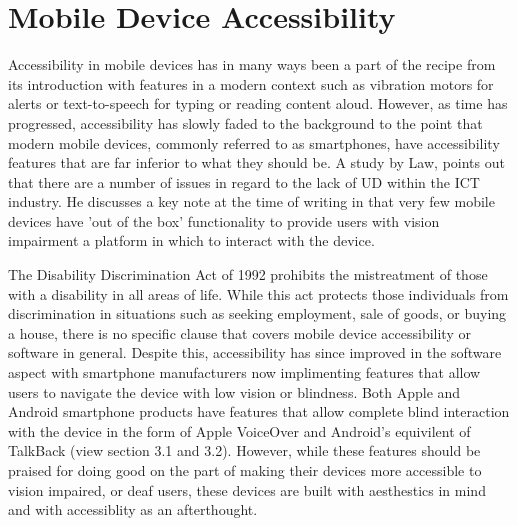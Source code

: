 
\section{Mobile Device Accessibility}
Accessibility in mobile devices has in many ways been a part of the recipe from its introduction with features in a modern context such as vibration motors for alerts or text-to-speech for typing or reading content aloud.
However, as time has progressed, accessibility has slowly faded to the background to the point that modern mobile devices, commonly referred to as smartphones, have accessibility features that are far inferior to what they should be. %
A study by Law\cite{cellphone}, points out that there are a number of issues in regard to the lack of UD within the ICT industry. %
He discusses a key note at the time of writing in that very few mobile devices have 'out of the box' functionality to provide users with vision impairment a platform in which to interact with the device. %

The Disability Discrimination Act of 1992\cite{dda1992} prohibits the mistreatment of those with a disability in all areas of life.
While this act protects those individuals from discrimination in situations such as seeking employment, sale of goods, or buying a house, there is no specific clause that covers mobile device accessibility or software in general.
Despite this, accessibility has since improved in the software aspect with smartphone manufacturers now implimenting features that allow users to navigate the device with low vision or blindness.
Both Apple and Android smartphone products have features that allow complete blind interaction with the device in the form of Apple VoiceOver \cite{iphone} and Android's equivilent of TalkBack \cite{android} (view section 3.1 and 3.2).
However, while these features should be praised for doing good on the part of making their devices more accessible to vision impaired, or deaf users, these devices are built with aesthestics in mind and with accessiblity as an afterthought.


